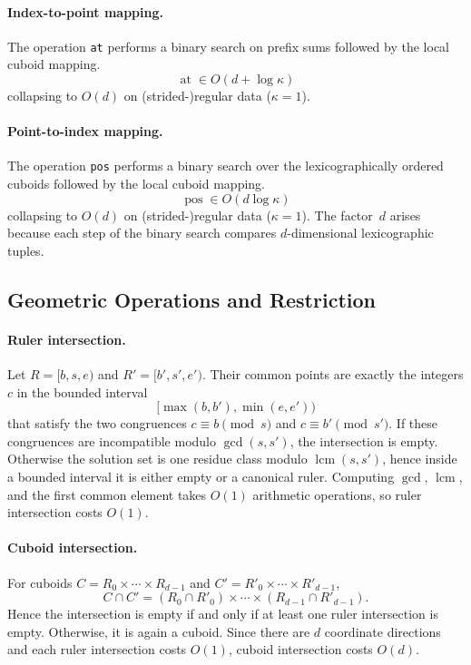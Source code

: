 \documentclass[manuscript,screen,review]{acmart}
\theoremstyle{definition}
\theoremstyle{plain}
\begin{document}
\paragraph{Index-to-point mapping.}
The operation \texttt{at} performs a binary search on prefix sums followed by the local cuboid mapping.
\[
  \operatorname{at} \in O(d + \log \kappa)
\]
collapsing to $O(d)$ on (strided-)regular data ($\kappa=1$).

\paragraph{Point-to-index mapping.}
The operation \texttt{pos} performs a binary search over the lexicographically ordered cuboids followed by the local cuboid mapping.
\[
  \operatorname{pos} \in O(d\log \kappa)
\]
collapsing to $O(d)$ on (strided-)regular data ($\kappa=1$).
The factor~$d$ arises because each step of the binary search compares $d$-dimensional lexicographic tuples.

\subsection{Geometric Operations and Restriction}
\label{section:operations-restriction}

\paragraph{Ruler intersection.}
Let $R=[b,s,e)$ and $R'=[b',s',e')$. Their common points are exactly the integers $c$ in the bounded interval
\[
  [\max(b,b'), \min(e,e'))
\]
that satisfy the two congruences $c \equiv b \pmod s$ and $c \equiv b' \pmod {s'}$. If these congruences are incompatible modulo $\gcd(s,s')$, the intersection is empty. Otherwise the solution set is one residue class modulo $\operatorname{lcm}(s,s')$, hence inside a bounded interval it is either empty or a canonical ruler. Computing $\gcd$, $\operatorname{lcm}$, and the first common element takes $O(1)$ arithmetic operations, so ruler intersection costs $O(1)$.

\paragraph{Cuboid intersection.}
For cuboids $C = R_0 \times \cdots \times R_{d-1}$ and $C' = R'_0 \times \cdots \times R'_{d-1}$,
\[
  C \cap C' = (R_0 \cap R'_0) \times \cdots \times (R_{d-1} \cap R'_{d-1}).
\]
Hence the intersection is empty if and only if at least one ruler intersection is empty. Otherwise, it is again a cuboid. Since there are $d$ coordinate directions and each ruler intersection costs $O(1)$, cuboid intersection costs $O(d)$.
\end{document}
